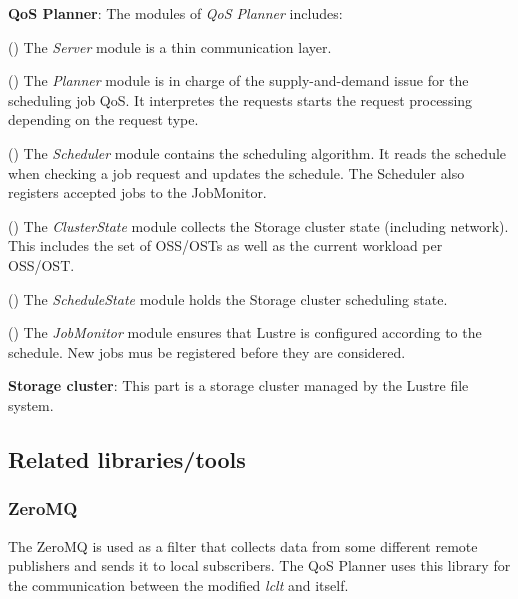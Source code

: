 \documentclass[10pt]{article}
\begin{document}
\textbf{QoS Planner}: The modules of \emph{QoS Planner} includes:

(\textbf{{}}) The \emph{Server} module is a thin communication layer.

(\textbf{{}})  The \emph{Planner} module is in charge of the supply-and-demand issue for the scheduling job QoS. It interpretes the requests starts the request processing depending on the request type.

(\textbf{{}}) The \emph{Scheduler} module contains the scheduling algorithm. It reads the schedule when checking a job request and updates the schedule. The Scheduler also registers accepted jobs to the JobMonitor.

(\textbf{{}}) The \emph{ClusterState} module collects the Storage cluster state (including network). This includes the set of OSS/OSTs as well as the current workload per OSS/OST.

(\textbf{{}}) The \emph{ScheduleState} module holds the Storage cluster scheduling state.

(\textbf{{}}) The \emph{JobMonitor} module ensures that Lustre is configured according to the schedule. New jobs mus be registered before they are considered.

\textbf{Storage cluster}: This part is a storage cluster managed by the Lustre file system.

%
\subsection{Related libraries/tools}
%
\subsubsection{ZeroMQ}
%
The ZeroMQ is used as a filter that collects data from some different remote publishers and sends it to local subscribers. The QoS Planner uses this library for the communication between the modified \emph{lclt} and itself.
\end{document}
